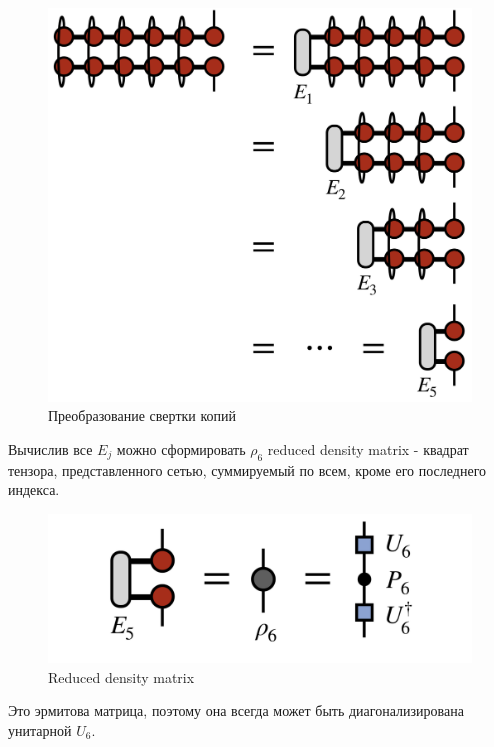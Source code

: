 \begin{figure}[h!tp]
\centering
\includegraphics[scale=0.3]{MatrixProductState_TensorTrain/dm_comput.png}
\caption{Преобразование свертки копий}
\label{fig:ConvDiag1}
\end{figure}

Вычислив все $E_j$ можно сформировать $\rho_6$ reduced density matrix - квадрат тензора, представленного сетью, суммируемый по всем, кроме его последнего индекса.

\begin{figure}[h!tp]
\centering
\includegraphics[scale=0.3]{MatrixProductState_TensorTrain/diag_rho6.png}
\caption{Reduced density matrix}
\label{fig:ReducedDensityMatrixDiag}
\end{figure}

Это эрмитова матрица, поэтому она всегда может быть диагонализирована унитарной $U_6$. 



